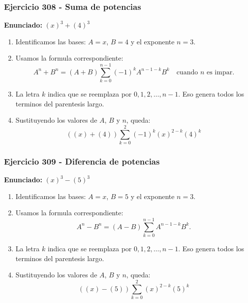 \documentclass[11pt,a4paper]{article}
\begin{document}
\subsubsection*{Ejercicio 308 - Suma de potencias}
\textbf{Enunciado:} $ \left(x\right)^{3}+\left(4\right)^{3} $\par
\begin{enumerate}[leftmargin=2em]
\item Identificamos las bases: \(A=x\), \(B=4\) y el exponente \(n=3\).
\item Usamos la formula correspondiente: \[A^n+B^n=(A+B)\sum_{k=0}^{n-1}(-1)^kA^{n-1-k}B^k\quad\text{cuando }n\text{ es impar}.\]
\item La letra \(k\) indica que se reemplaza por \(0,1,2,\ldots,n-1\). Eso genera todos los terminos del parentesis largo.
\item Sustituyendo los valores de \(A\), \(B\) y \(n\), queda: \[\boxed{\left(\left(x\right)+\left(4\right)\right)\sum_{k=0}^{2}(-1)^k\left(x\right)^{2-k}\left(4\right)^k}\]
\end{enumerate}

\vspace{0.2cm}
\subsubsection*{Ejercicio 309 - Diferencia de potencias}
\textbf{Enunciado:} $ \left(x\right)^{3}-\left(5\right)^{3} $\par
\begin{enumerate}[leftmargin=2em]
\item Identificamos las bases: \(A=x\), \(B=5\) y el exponente \(n=3\).
\item Usamos la formula correspondiente: \[A^n-B^n=(A-B)\sum_{k=0}^{n-1}A^{n-1-k}B^k.\]
\item La letra \(k\) indica que se reemplaza por \(0,1,2,\ldots,n-1\). Eso genera todos los terminos del parentesis largo.
\item Sustituyendo los valores de \(A\), \(B\) y \(n\), queda: \[\boxed{\left(\left(x\right)-\left(5\right)\right)\sum_{k=0}^{2}\left(x\right)^{2-k}\left(5\right)^k}\]
\end{enumerate}

\vspace{0.2cm}
\end{document}
